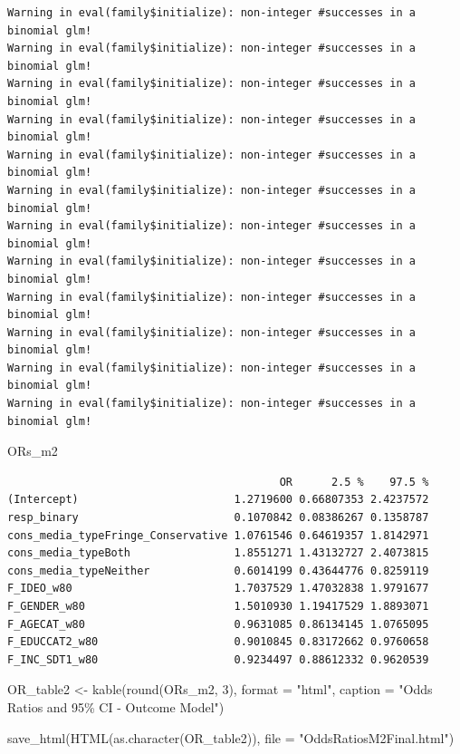 \documentclass[
  letterpaper,
  DIV=11,
  numbers=noendperiod]{scrartcl}
\newenvironment{Shaded}{\begin{snugshade}}{\end{snugshade}}
\newcommand{\AttributeTok}[1]{\textcolor[rgb]{0.40,0.45,0.13}{#1}}
\newcommand{\DecValTok}[1]{\textcolor[rgb]{0.68,0.00,0.00}{#1}}
\newcommand{\FunctionTok}[1]{\textcolor[rgb]{0.28,0.35,0.67}{#1}}
\newcommand{\NormalTok}[1]{\textcolor[rgb]{0.00,0.23,0.31}{#1}}
\newcommand{\OtherTok}[1]{\textcolor[rgb]{0.00,0.23,0.31}{#1}}
\newcommand{\StringTok}[1]{\textcolor[rgb]{0.13,0.47,0.30}{#1}}
\begin{document}
\begin{verbatim}
Warning in eval(family$initialize): non-integer #successes in a binomial glm!
Warning in eval(family$initialize): non-integer #successes in a binomial glm!
Warning in eval(family$initialize): non-integer #successes in a binomial glm!
Warning in eval(family$initialize): non-integer #successes in a binomial glm!
Warning in eval(family$initialize): non-integer #successes in a binomial glm!
Warning in eval(family$initialize): non-integer #successes in a binomial glm!
Warning in eval(family$initialize): non-integer #successes in a binomial glm!
Warning in eval(family$initialize): non-integer #successes in a binomial glm!
Warning in eval(family$initialize): non-integer #successes in a binomial glm!
Warning in eval(family$initialize): non-integer #successes in a binomial glm!
Warning in eval(family$initialize): non-integer #successes in a binomial glm!
Warning in eval(family$initialize): non-integer #successes in a binomial glm!
\end{verbatim}

\begin{Shaded}
\begin{Highlighting}[]
\NormalTok{ORs\_m2}
\end{Highlighting}
\end{Shaded}

\begin{verbatim}
                                          OR      2.5 %    97.5 %
(Intercept)                        1.2719600 0.66807353 2.4237572
resp_binary                        0.1070842 0.08386267 0.1358787
cons_media_typeFringe_Conservative 1.0761546 0.64619357 1.8142971
cons_media_typeBoth                1.8551271 1.43132727 2.4073815
cons_media_typeNeither             0.6014199 0.43644776 0.8259119
F_IDEO_w80                         1.7037529 1.47032838 1.9791677
F_GENDER_w80                       1.5010930 1.19417529 1.8893071
F_AGECAT_w80                       0.9631085 0.86134145 1.0765095
F_EDUCCAT2_w80                     0.9010845 0.83172662 0.9760658
F_INC_SDT1_w80                     0.9234497 0.88612332 0.9620539
\end{verbatim}

\begin{Shaded}
\begin{Highlighting}[]
\NormalTok{OR\_table2 }\OtherTok{\textless{}{-}} \FunctionTok{kable}\NormalTok{(}\FunctionTok{round}\NormalTok{(ORs\_m2, }\DecValTok{3}\NormalTok{), }\AttributeTok{format =} \StringTok{"html"}\NormalTok{, }\AttributeTok{caption =} \StringTok{"Odds Ratios and 95\% CI {-} Outcome Model"}\NormalTok{)}

\FunctionTok{save\_html}\NormalTok{(}\FunctionTok{HTML}\NormalTok{(}\FunctionTok{as.character}\NormalTok{(OR\_table2)), }\AttributeTok{file =} \StringTok{"OddsRatiosM2Final.html"}\NormalTok{)}
\end{Highlighting}
\end{Shaded}
\end{document}
